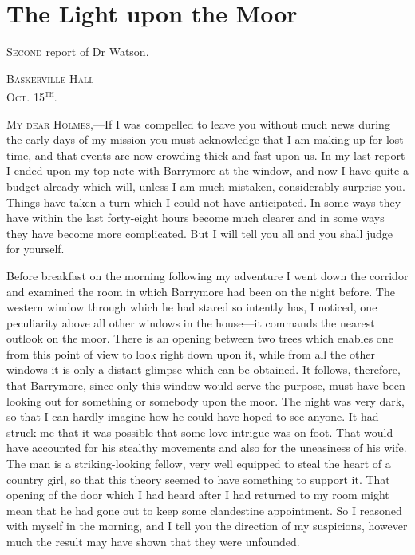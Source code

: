 \documentclass[paper=a5,BCOR=7mm,twoside,DIV=calc,12pt,usegeometry,openany,chapterprefix,endperiod,headings=big]{scrbook} %
\begin{document}

\chapter{The Light upon the Moor}

\lettrine[lines=1]{S}{econd} report of Dr Watson. \\

\hfill\begin{minipage}{0.5\linewidth}\textsc{Baskerville Hall\\Oct. 15\textsuperscript{th}.}\end{minipage}

\textsc{My dear Holmes},---If I was compelled to leave you without much news during the early days of my mission you must acknowledge that I am making up for lost time, and that events are now crowding thick and fast upon us. In my last report I ended upon my top note with Barrymore at the window, and now I have quite a budget already which will, unless I am much mistaken, considerably surprise you. Things have taken a turn which I could not have anticipated. In some ways they have within the last forty-eight hours become much clearer and in some ways they have become more complicated. But I will tell you all and you shall judge for yourself.

Before breakfast on the morning following my adventure I went down the corridor and examined the room in which Barrymore had been on the night before. The western window through \newline which he had stared so intently has, I noticed, one peculiarity above all other windows in the house---it commands the nearest outlook on the moor. There is an opening between two trees which enables one from this point of view to look right down upon it, while from all the other windows it is only a distant glimpse which can be obtained. It follows, therefore, that Barrymore, since only this window would serve the purpose, must have been looking out for something or somebody upon the moor. The night was very dark, so that I can hardly imagine how he could have hoped to see anyone. It had struck me that it was possible that some love intrigue was on foot. That would have accounted for his stealthy movements and also for the uneasiness of his wife. The man is a striking-looking fellow, very well equipped to steal the heart of a country girl, so that this theory seemed to have something to support it. That opening of the door which I had heard after I had returned to my room might mean that he had gone out to keep some clandestine appointment. So I reasoned with myself in the morning, and I tell you the direction of my suspicions, however much the result may have shown that they were unfounded.
\end{document}
